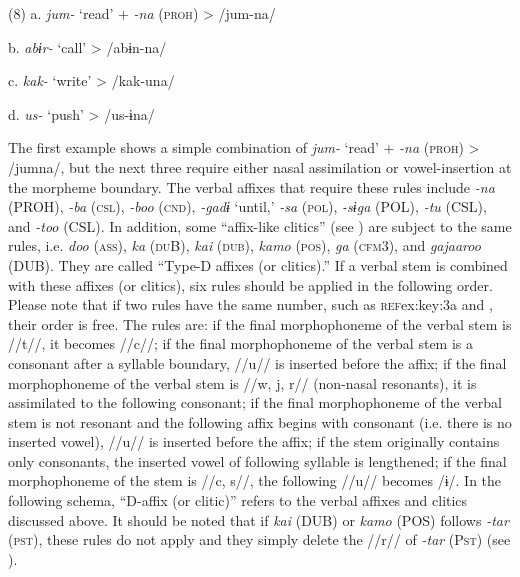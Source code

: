 (8)  a.  \textit{jum-}  ‘read’  +  \textit{{}-na} (\textsc{proh})  >  /jum-na/

  b.  \textit{abɨr-}  ‘call’        >  /abɨn-na/

  c.  \textit{kak-}  ‘write’        >  /kak-una/

  d.  \textit{us-}  ‘push’        >  /us-ɨna/

The first example shows a simple combination of \textit{jum-} ‘read’ + \textit{{}-na} (\textsc{proh}) > /jumna/, but the next three require either nasal assimilation or vowel-insertion at the morpheme boundary. The verbal affixes that require these rules include \textit{{}-na} (PROH), \textit{{}-ba} (\textsc{csl}), \textit{{}-boo} (\textsc{cnd}), \textit{{}-gadɨ} ‘until,’ \textit{{}-sa} (\textsc{pol}), \textit{{}-sɨga} (POL), \textit{{}-tu} (CSL), and \textit{{}-too} (CSL). In addition, some “affix-like clitics” (see ) are subject to the same rules, i.e. \textit{doo} (\textsc{ass}), \textit{ka} (\textsc{du}B), \textit{kai} (\textsc{dub}), \textit{kamo} (\textsc{pos}), \textit{ga} (\textsc{cfm}3), and \textit{gajaaroo} (DUB). They are called “Type-D affixes (or clitics).” If a verbal stem is combined with these affixes (or clitics), six rules should be applied in the following order. Please note that if two rules have the same number, such as \textsc{ref}{ex:key:3a} and , their order is free. The rules are:  if the final morphophoneme of the verbal stem is //t//, it becomes //c//;  if the final morphophoneme of the verbal stem is a consonant after a syllable boundary, //u// is inserted before the affix;  if the final morphophoneme of the verbal stem is //w, j, r// (non-nasal resonants), it is assimilated to the following consonant;  if the final morphophoneme of the verbal stem is not resonant and the following affix begins with consonant (i.e. there is no inserted vowel), //u// is inserted before the affix;  if the stem originally contains only consonants, the inserted vowel of following syllable is lengthened;  if the final morphophoneme of the stem is //c, s//, the following //u// becomes /ɨ/. In the following schema, “D-affix (or clitic)” refers to the verbal affixes and clitics discussed above. It should be noted that if \textit{kai} (DUB) or \textit{kamo} (POS) follows \textit{{}-tar} (\textsc{pst}), these rules do not apply and they simply delete the //r// of \textit{{}-tar} (P\textsc{st}) (see ).

